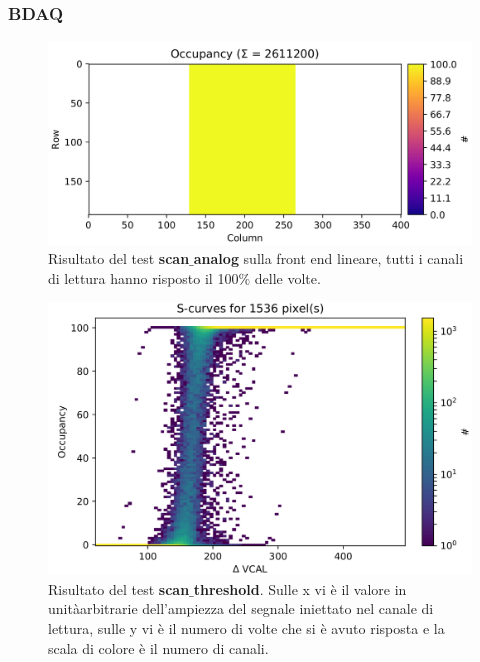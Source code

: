 \subsubsection{BDAQ}
\begin{figure}
\centering
\includegraphics[width=\textwidth]{Immagini/ScanAnalogLinear}
\caption{Risultato del test \textbf{scan$\_$analog} sulla front end lineare, tutti i canali di lettura hanno risposto il 100$\%$ delle volte.}
\label{ScanAnalogLinear}
\end{figure}
\begin{figure}
\centering
\includegraphics[width=\textwidth]{Immagini/Scurves}
\caption{Risultato del test \textbf{scan$\_$threshold}. Sulle x vi è il valore in unitàarbitrarie dell'ampiezza del segnale iniettato nel canale di lettura, sulle y vi è il numero di volte che si è avuto risposta e la scala di colore è il numero di canali.}
\label{Scurves}
\end{figure}
